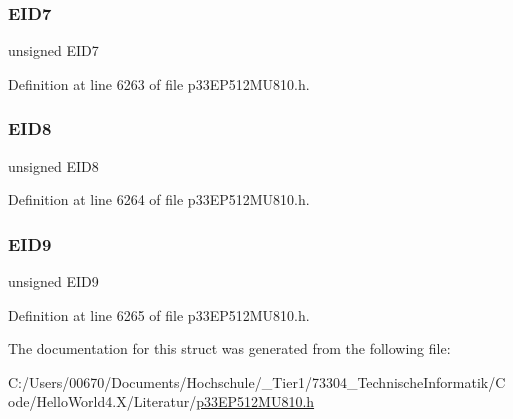 \subsubsection{\texorpdfstring{E\+I\+D7}{EID7}}
{\footnotesize\ttfamily unsigned E\+I\+D7}



Definition at line 6263 of file p33\+E\+P512\+M\+U810.\+h.

\mbox{\label{structtag_c2_r_x_f1_e_i_d_b_i_t_s_acca25e0b7d86eb499d01f85222baea87}} 
\subsubsection{\texorpdfstring{E\+I\+D8}{EID8}}
{\footnotesize\ttfamily unsigned E\+I\+D8}



Definition at line 6264 of file p33\+E\+P512\+M\+U810.\+h.

\mbox{\label{structtag_c2_r_x_f1_e_i_d_b_i_t_s_ac6748f73d4ada8538b06548be4f396c2}} 
\subsubsection{\texorpdfstring{E\+I\+D9}{EID9}}
{\footnotesize\ttfamily unsigned E\+I\+D9}



Definition at line 6265 of file p33\+E\+P512\+M\+U810.\+h.



The documentation for this struct was generated from the following file\+:\begin{DoxyCompactItemize}
\item 
C\+:/\+Users/00670/\+Documents/\+Hochschule/\+\_\+\+Tier1/73304\+\_\+\+Technische\+Informatik/\+Code/\+Hello\+World4.\+X/\+Literatur/\hyperlink{p33_e_p512_m_u810_8h}{p33\+E\+P512\+M\+U810.\+h}\end{DoxyCompactItemize}
